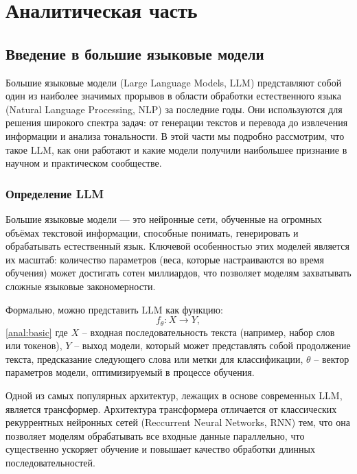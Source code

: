 \chapter{Аналитическая часть}

\section{Введение в большие языковые модели}

Большие языковые модели (Large Language Models, LLM) представляют собой один из наиболее значимых прорывов в области обработки естественного языка (Natural Language Processing, NLP) за последние годы. 
Они используются для решения широкого спектра задач: от генерации текстов и перевода до извлечения информации и анализа тональности. 
В этой части мы подробно рассмотрим, что такое LLM, как они работают и какие модели получили наибольшее признание в научном и практическом сообществе.

\subsection{Определение LLM}

Большие языковые модели — это нейронные сети, обученные на огромных объёмах текстовой информации, способные понимать, генерировать и обрабатывать естественный язык. 
Ключевой особенностью этих моделей является их масштаб: количество параметров (веса, которые настраиваются во время обучения) может достигать сотен миллиардов, 
что позволяет моделям захватывать сложные языковые закономерности.

Формально, можно представить LLM как функцию:
\[
f_\theta: X \rightarrow Y, 
\] \ref{anal:basic}
где
\(X\) -- входная последовательность текста (например, набор слов или токенов),
\(Y\) -- выход модели, который может представлять собой продолжение текста, предсказание следующего слова или метки для классификации,
\(\theta\) -- вектор параметров модели, оптимизируемый в процессе обучения.

Одной из самых популярных архитектур, лежащих в основе современных LLM, является трансформер. 
Архитектура трансформера отличается от классических рекуррентных нейронных сетей (Reccurrent Neural Networks, RNN) тем, что она позволяет моделям обрабатывать все входные данные параллельно, 
что существенно ускоряет обучение и повышает качество обработки длинных последовательностей. 

